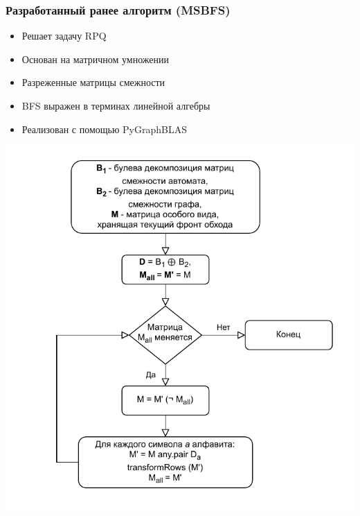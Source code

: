 \documentclass{beamer}
\begin{document}
\begin{frame}[fragile]
  \frametitle{Разработанный ранее алгоритм (MSBFS)}
  \noindent\begin{minipage}{0.4\textwidth}
    \begin{itemize}
      \item Решает задачу RPQ
      \item Основан на матричном умножении
      \item Разреженные матрицы смежности
      \item BFS выражен в терминах линейной алгебры
      \item Реализован с помощью PyGraphBLAS\footnotemark
    \end{itemize}
  \end{minipage}
  \noindent\begin{minipage}{0.58\textwidth}
    \includegraphics[width=1\linewidth]{pictures/algo.pdf}
  \end{minipage}
\end{frame}
\end{document}

